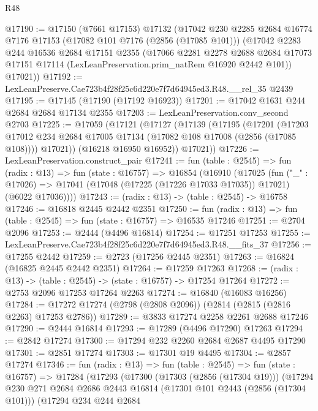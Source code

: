\begin{lexlean}{R48}
\begin{coremodule}
@17190 := @17150
    (@7661 @17153)
    @17132
    (@17042
      @230
      @2285
      @2684
      @16774
      @7176
      @17153
      (@17082 @101 @7176 (@2856 (@17085 @101)))
      (@17042
        @2283
        @244
        @16536
        @2684
        @17151
        @2355
        (@17066
          @2281
          @2278
          @2688
          @2684
          @17073
          @17151
          @17114
          (LexLeanPreservation.prim_natRem @16920 @2442 @101))
        @17021))
@17192 := LexLeanPreserve.Cae723b4f28f25c6d220e7f7d64945ed3.R48.__rel_35 @2439
@17195 := @17145 (@17190 (@17192 @16923))
@17201 := @17042 @1631 @244 @2684 @2684 @17134 @2355
@17203 := LexLeanPreservation.conv_second @2703
@17225 := @17059
    (@17121
      (@17127
        (@17139
          (@17195
            (@17201
              (@17203 @17012 @234 @2684 @17005 @17134 (@17082 @108 @17008 (@2856 (@17085 @108))))
              @17021))
          (@16218 @16950 @16952))
        @17021))
@17226 := LexLeanPreservation.construct_pair
@17241 := fun (table : @2545) =>
  fun (radix : @13) =>
  fun (state : @16757) =>
  @16854
    (@16910
      (@17025
        (fun ("_" : @17026) =>
        @17041 (@17048 (@17225 (@17226 @17033 @17035)) @17021) (@6022 @17036))))
@17243 := (radix : @13) -> (table : @2545) -> @16758
@17246 := @16818 @2445 @2442 @2351
@17250 := fun (radix : @13) => fun (table : @2545) => fun (state : @16757) => @16535 @17246
@17251 := @2704 @2096
@17253 := @2444 (@4496 @16814)
@17254 := @17251 @17253
@17255 := LexLeanPreserve.Cae723b4f28f25c6d220e7f7d64945ed3.R48.__fits_37
@17256 := @17255 @2442
@17259 := @2723 (@17256 @2445 @2351)
@17263 := @16824 (@16825 @2445 @2442 @2351)
@17264 := @17259 @17263
@17268 := (radix : @13) -> (table : @2545) -> (state : @16757) -> @17254 @17264
@17272 := @2753 @2096 @17253 @17264 @2263
@17274 := @16840 (@16083 @16256)
@17284 := @17272 @17274 (@2798 (@2808 @2096)) (@2814 (@2815 (@2816 @2263) @17253 @2786))
@17289 := @3833 @17274 @2258 @2261 @2688 @17246
@17290 := @2444 @16814
@17293 := @17289 (@4496 @17290) @17263
@17294 := @2842 @17274
@17300 := @17294 @232 @2260 @2684 @2687 @4495 @17290
@17301 := @2851 @17274
@17303 := @17301 @19 @4495
@17304 := @2857 @17274
@17346 := fun (radix : @13) =>
  fun (table : @2545) =>
  fun (state : @16757) =>
  @17284
    (@17293
      (@17300
        (@17303 (@2856 (@17304 @19)))
        (@17294
          @230
          @271
          @2684
          @2686
          @2443
          @16814
          (@17301 @101 @2443 (@2856 (@17304 @101)))
          (@17294
            @234
            @244
            @2684

\end{coremodule}
\end{lexlean}
